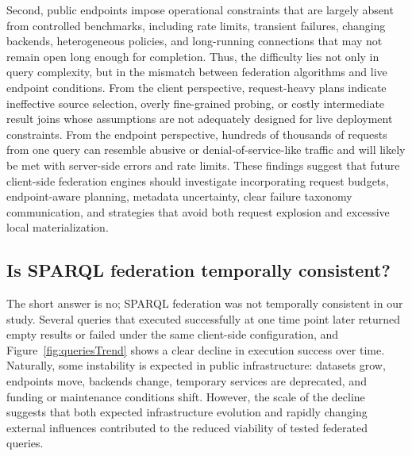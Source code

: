 \documentclass[runningheads]{llncs}
\begin{document}
Second, public endpoints impose operational constraints that are largely absent from controlled benchmarks, including rate limits, transient failures, changing backends, heterogeneous policies, and long-running connections that may not remain open long enough for completion. 
Thus, the difficulty lies not only in query complexity, but in the mismatch between federation algorithms and live endpoint conditions. 
From the client perspective, request-heavy plans indicate ineffective source selection, overly fine-grained probing, or costly intermediate result joins whose assumptions are not adequately designed for live deployment constraints.
From the endpoint perspective, hundreds of thousands of requests from one query can resemble abusive or denial-of-service-like traffic and will likely be met with server-side errors and rate limits. 
These findings suggest that future client-side federation engines should investigate incorporating request budgets, endpoint-aware planning, metadata uncertainty, clear failure taxonomy communication, and strategies that avoid both request explosion and excessive local materialization.



\subsection{Is SPARQL federation temporally consistent?}
The short answer is no; SPARQL federation was not temporally consistent in our study. 
Several queries that executed successfully at one time point later returned empty results or failed under the same client-side configuration, and Figure~\ref{fig:queriesTrend} shows a clear decline in execution success over time. 
Naturally, some instability is expected in public infrastructure: datasets grow, endpoints move, backends change, temporary services are deprecated, and funding or maintenance conditions shift. 
However, the scale of the decline suggests that both expected infrastructure evolution and rapidly changing external influences contributed to the reduced viability of tested federated queries.
\end{document}
